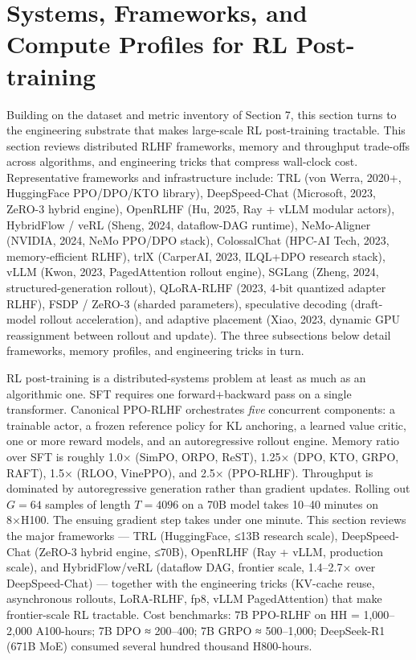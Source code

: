 \section{Systems, Frameworks, and Compute Profiles for RL Post-training}\label{systems-frameworks-and-compute-profiles-for-rl-post-training}

Building on the dataset and metric inventory of Section 7, this section turns to the engineering substrate that makes large-scale RL post-training tractable. This section reviews distributed RLHF frameworks, memory and throughput trade-offs across algorithms, and engineering tricks that compress wall-clock cost. Representative frameworks and infrastructure include: TRL (von Werra, 2020+, HuggingFace PPO/DPO/KTO library), DeepSpeed-Chat (Microsoft, 2023, ZeRO-3 hybrid engine), OpenRLHF (Hu, 2025, Ray + vLLM modular actors), HybridFlow / veRL (Sheng, 2024, dataflow-DAG runtime), NeMo-Aligner (NVIDIA, 2024, NeMo PPO/DPO stack), ColossalChat (HPC-AI Tech, 2023, memory-efficient RLHF), trlX (CarperAI, 2023, ILQL+DPO research stack), vLLM (Kwon, 2023, PagedAttention rollout engine), SGLang (Zheng, 2024, structured-generation rollout), QLoRA-RLHF (2023, 4-bit quantized adapter RLHF), FSDP / ZeRO-3 (sharded parameters), speculative decoding (draft-model rollout acceleration), and adaptive placement (Xiao, 2023, dynamic GPU reassignment between rollout and update). The three subsections below detail frameworks, memory profiles, and engineering tricks in turn.

RL post-training is a distributed-systems problem at least as much as an algorithmic one. SFT requires one forward+backward pass on a single transformer. Canonical PPO-RLHF orchestrates \emph{five} concurrent components: a trainable actor, a frozen reference policy for KL anchoring, a learned value critic, one or more reward models, and an autoregressive rollout engine. Memory ratio over SFT is roughly 1.0× (SimPO, ORPO, ReST), 1.25× (DPO, KTO, GRPO, RAFT), 1.5× (RLOO, VinePPO), and 2.5× (PPO-RLHF). Throughput is dominated by autoregressive generation rather than gradient updates. Rolling out \(G = 64\) samples of length \(T = 4096\) on a 70B model takes 10--40 minutes on 8×H100. The ensuing gradient step takes under one minute. This section reviews the major frameworks --- TRL (HuggingFace, ≤13B research scale), DeepSpeed-Chat (ZeRO-3 hybrid engine, ≤70B), OpenRLHF (Ray + vLLM, production scale), and HybridFlow/veRL (dataflow DAG, frontier scale, 1.4--2.7× over DeepSpeed-Chat) --- together with the engineering tricks (KV-cache reuse, asynchronous rollouts, LoRA-RLHF, fp8, vLLM PagedAttention) that make frontier-scale RL tractable. Cost benchmarks: 7B PPO-RLHF on HH = 1,000--2,000 A100-hours; 7B DPO ≈ 200--400; 7B GRPO ≈ 500--1,000; DeepSeek-R1 (671B MoE) consumed several hundred thousand H800-hours.

